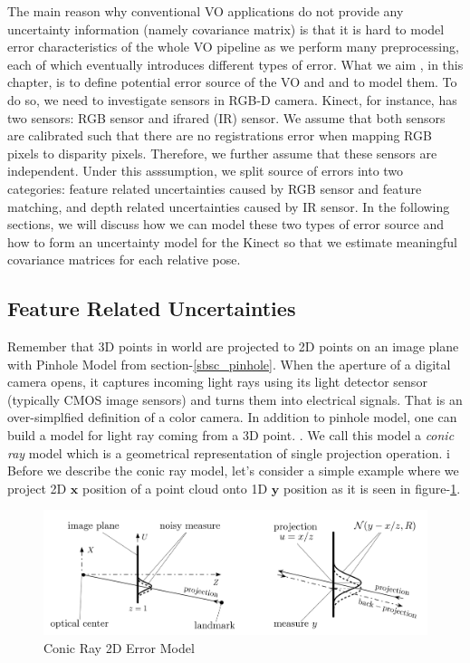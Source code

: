 \documentclass[a4paper]{report}
\numberwithin{figure}{section}
\begin{document}
The main reason why conventional VO applications do not provide any uncertainty 
information (namely covariance matrix) is that it is hard to model 
error characteristics of the whole VO pipeline as we perform many preprocessing, 
each of which eventually introduces different types of error. What we aim 
, in this chapter, is to define potential error source of the VO and 
and to model them. To do so, we need to investigate sensors in RGB-D camera. 
Kinect, for instance, has two sensors: RGB sensor 
and ifrared (IR) sensor. We assume that both sensors are calibrated such that 
there are no registrations error when mapping RGB pixels to disparity pixels. 
Therefore, 
we further assume that these sensors are independent. Under this asssumption, 
we split source of errors into two categories: feature related uncertainties 
caused by RGB sensor and feature matching, and depth related uncertainties caused by 
IR sensor. In the following sections, we will discuss how we can model these 
two types of error source and how to form an uncertainty model 
for the Kinect so that we estimate meaningful covariance matrices for each 
relative pose.

\subsection{Feature Related Uncertainties} \label{sb_sc_pixel_uncertainty}

Remember that 3D points in world are projected to 2D points on an image plane with 
Pinhole Model from section-\ref{sbsc_pinhole}. When the aperture of a digital 
camera opens, it captures incoming light rays using its light detector sensor 
(typically CMOS image sensors) and turns them into electrical signals. That 
is an over-simplfied definition of a color camera. In addition to pinhole 
model, one can build a model for light ray coming from a 3D point.
. We call this model 
a \textit{conic ray} model which is a geometrical representation of 
single projection operation. i
Before we describe the conic ray model, let's consider a simple example where we 
project 2D $\mathbf{x}$ position of a point cloud onto 1D $\mathbf{y}$ position
as it is seen in figure-\ref{fig:conic_ray_2d_error_model}.


\begin{figure}[H]
	\centering
  \includegraphics[width=0.7\linewidth,natwidth=640,natheight=640]
  {fig/ref_imgs/conic_ray_2d_model.png}
  \caption{Conic Ray 2D Error Model}
	\label{fig:conic_ray_2d_error_model}
\end{figure}
\end{document}
